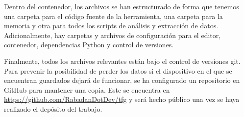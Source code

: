 Dentro del contenedor, los archivos se han estructurado de forma que tenemos una carpeta para el código fuente de la herramienta, una carpeta para la memoria y otra para todos los scripts de análisis y extracción de datos. Adicionalmente, hay carpetas y archivos de configuración para el editor, contenedor, dependencias Python y control de versiones.

Finalmente, todos los archivos relevantes están bajo el control de versiones git. Para prevenir la posibilidad de perder los datos si el dispositivo en el que se encuentran guardados dejará de funcionar, se ha configurado un repositorio en GitHub para mantener una copia. Este se encuentra en \url{https://github.com/RabadanDotDev/tfg} y será hecho público una vez se haya realizado el depósito del trabajo.
